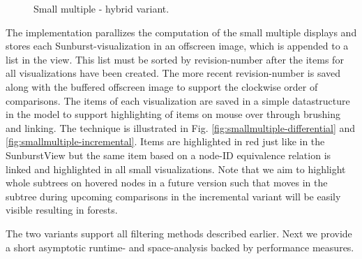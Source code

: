 \begin{itemize}
\begin{figure}[tb]
\caption{\label{fig:wikipedia-smallmultiples-hybrid} Small multiple - hybrid variant.}
\end{figure}
\end{itemize}

The implementation parallizes the computation of the small multiple displays and stores each Sunburst-visualization in an offscreen image, which is appended to a list in the view. This list must be sorted by revision-number after the items for all visualizations have been created. The more recent revision-number is saved along with the buffered offscreen image to support the clockwise order of comparisons. The items of each visualization are saved in a simple datastructure in the model to support highlighting of items on mouse over through brushing and linking. The technique is illustrated in Fig. \ref{fig:smallmultiple-differential} and \ref{fig:smallmultiple-incremental}. Items are highlighted in red just like in the SunburstView but the same item based on a node-ID equivalence relation is linked and highlighted in all small visualizations. Note that we aim to highlight whole subtrees on hovered nodes in a future version such that moves in the subtree during upcoming comparisons in the incremental variant will be easily visible resulting in forests. 

The two variants support all filtering methods described earlier. Next we provide a short asymptotic runtime- and space-analysis backed by performance measures.

